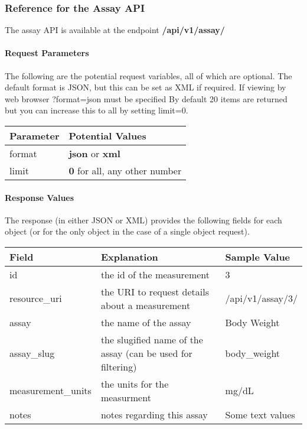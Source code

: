 \documentclass[letterpaper,10pt,english]{sphinxmanual}
\begin{document}
\subsubsection{Reference for the Assay API}
\label{data:reference-for-the-assay-api}
The assay API is available at the endpoint \textbf{/api/v1/assay/}


\paragraph{Request Parameters}
\label{data:id1}
The following are the potential request variables, all of which are optional.  
The default format is JSON, but this can be set as XML if required.
If viewing by web browser ?format=json must be specified  
By default 20 items are returned but you can increase this to all by setting limit=0.

\begin{tabulary}{\linewidth}{|L|L|}
\hline
\textbf{
Parameter
} & \textbf{
Potential Values
}\\\hline

format
 & 
\textbf{json} or \textbf{xml}
\\\hline

limit
 & 
\textbf{0} for all, any other number
\\\hline
\end{tabulary}



\paragraph{Response Values}
\label{data:id2}
The response (in either JSON or XML) provides the following fields for each object (or for the only object in the case of a single object request).

\begin{tabulary}{\linewidth}{|L|L|L|}
\hline
\textbf{
Field
} & \textbf{
Explanation
} & \textbf{
Sample Value
}\\\hline

id
 & 
the id of the measurement
 & 
3
\\\hline

resource\_uri
 & 
the URI to request details about a measurement
 & 
/api/v1/assay/3/
\\\hline

assay
 & 
the name of the assay
 & 
Body Weight
\\\hline

assay\_slug
 & 
the slugified name of the assay (can be used for filtering)
 & 
body\_weight
\\\hline

measurement\_units
 & 
the units for the measurment
 & 
mg/dL
\\\hline

notes
 & 
notes regarding this assay
 & 
Some text values
\\\hline
\end{tabulary}
\end{document}
